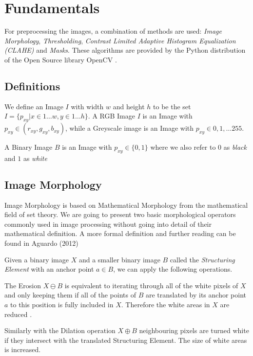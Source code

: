 
\section{Fundamentals}

For preprocessing the images, a combination of methods are used: \textit{Image
Morphology}, \textit{Thresholding}, \textit{Contrast Limited Adaptive Histogram
Equalization (CLAHE)} and \textit{Masks}. These algorithms are provided by the
Python distribution of the Open Source library OpenCV \cite{opencv_library}.

\subsection{Definitions}

We define an Image $I$ with width $w$ and height $h$ to be the set
$I = \{ p_{xy} | x \in 1 \dots w, y \in 1 \dots h \}$. A RGB Image $I$ is an
Image with $p_{xy} \in (r_{xy}, g_{xy}, b_{xy})$, while a Greyscale image is
an Image with $p_{xy} \in 0,1, \dots 255$.

A Binary Image $B$ is an Image with $p_{xy} \in \{0,1\}$ where we also refer to
$0$ as \textit{black} and $1$ as \textit{white}

\subsection{Image Morphology}

Image Morphology is based on Mathematical Morphology from the mathematical field
of set theory. We are going to present two basic morphological operators
commonly used in image processing without going into detail of their
mathematical definition. A more formal definition and further reading can be
found in Aguardo (2012) \cite{Aguardo2012}

Given a binary image $X$ and a smaller binary image $B$ called the
\textit{Structuring Element} with an anchor point $a \in B$,
we can apply the following operations.

The Erosion $X \ominus B$ is equivalent to iterating through all of the white
pixels of $X$ and only keeping them if all of the points of $B$ are translated
by its anchor point $a$ to this position is fully included in $X$. Therefore the
white areas in $X$ are reduced \cite{Smith1997}.


Similarly with the Dilation operation $X \oplus B$ neighbouring pixels are
turned white if they intersect with the translated Structuring Element. The size
of white areas is increased.

